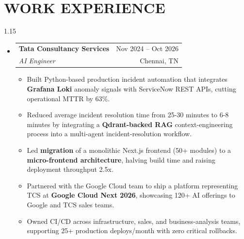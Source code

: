 \documentclass[letterpaper,11pt]{article}
\makeatletter
\newcommand{\resumeItem}[1]{
\item\small{
    {#1 \vspace{0pt}}
  }
}
\newcommand{\resumeSubheading}[4]{
  \vspace{2pt}
\item
  \begin{tabular*}{\textwidth}[t]{l@{\extracolsep{\fill}}r}
    \textbf{#1} & {\color{dark-grey}\small #2}\vspace{0pt}\\
    \textit{#3} & {\color{dark-grey} \small #4}\\
  \end{tabular*}\vspace{-2pt}
}
\newcommand{\resumeSubHeadingListStart}{
\begin{itemize}[leftmargin=0in, label={}]}
\newcommand{\resumeSubHeadingListEnd}{
  \end{itemize}\vspace{-2pt}}
\newcommand{\resumeItemListStart}{
\begin{itemize}[leftmargin=0.15in, itemsep=2pt, parsep=0pt, topsep=1pt]}
\newcommand{\resumeItemListEnd}{
  \end{itemize}\vspace{-1pt}}
\makeatother
\begin{document}
\section{WORK EXPERIENCE}
\begin{spacing}{1.15}
\resumeSubHeadingListStart

\resumeSubheading
{Tata Consultancy Services}{Nov 2024 -- Oct 2026}
{AI Engineer}{Chennai, TN}
\resumeItemListStart
\resumeItem{Built Python-based production incident automation that integrates \textbf{Grafana Loki} anomaly signals with ServiceNow REST APIs, cutting operational MTTR by 63\%.}
\resumeItem{Reduced average incident resolution time from 25-30 minutes to 6-8 minutes by integrating a \textbf{Qdrant-backed RAG} context-engineering process into a multi-agent incident-resolution workflow.}
\resumeItem{Led \textbf{migration} of a monolithic Next.js frontend (50+ modules) to a \textbf{micro-frontend architecture}, halving build time and raising deployment throughput 2.5x.}
\resumeItem{Partnered with the Google Cloud team to ship a platform representing TCS at \textbf{Google Cloud Next 2026}, showcasing 120+ AI offerings to Google and TCS sales teams.}
\resumeItem{Owned CI/CD across infrastructure, sales, and business-analysis teams, supporting 25+ production deploys/month with zero critical rollbacks.}
\resumeItemListEnd

\resumeSubHeadingListEnd
\end{spacing}

\vspace{-8pt}
\end{document}
